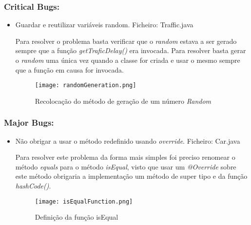 \subsubsection{Critical Bugs:}
\begin{itemize}
\item Guardar e reutilizar variáveis random.\newline
 Ficheiro: Traffic.java \newline


\par Para resolver o problema basta verificar que o \textit{random} estava a ser gerado sempre que a função \textit{getTraficDelay()} era invocada. Para resolver basta gerar o \textit{random} uma única vez quando a classe for criada e usar o mesmo sempre que a função em causa for invocada.

\begin{figure}[H]

  \centering

  \texttt{[image: randomGeneration.png]}

  \caption {Recolocação do método de geração de um número \textit{Random}}

  \label {fig06}

\end{figure}
\end{itemize}

\subsubsection{Major Bugs:}
\begin{itemize}
\item Não obrigar a usar o método redefinido usando \textit{override}.\newline
 Ficheiro: Car.java\newline

\par Para resolver este problema da forma mais simples foi preciso renomear o método \textit{equals} para o método \textit{isEqual}, visto que usar um \textit{@Override} sobre este método obrigaria a implementação um método de super tipo e da função \textit{hashCode()}.


\begin{figure}[H]

  \centering

  \texttt{[image: isEqualFunction.png]}

  \caption {Definição da função isEqual}

  \label {fig07}

\end{figure}

\end{itemize}

